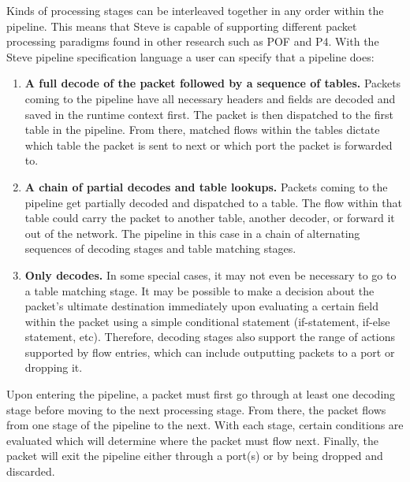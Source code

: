 Kinds of processing stages can be interleaved together in any order within the pipeline. This means that Steve is capable of supporting different packet processing paradigms found in other research such as POF and P4. With the Steve pipeline specification language a user can specify that a pipeline does:

\begin{enumerate}
\item \textbf{A full decode of the packet followed by a sequence of tables.} Packets coming to the pipeline have all necessary headers and fields are decoded and saved in the runtime context first. The packet is then dispatched to the first table in the pipeline. From there, matched flows within the tables dictate which table the packet is sent to next or which port the packet is forwarded to.
\item \textbf{A chain of partial decodes and table lookups.} Packets coming to the pipeline get partially decoded and dispatched to a table. The flow within that table could carry the packet to another table, another decoder, or forward it out of the network. The pipeline in this case in a chain of alternating sequences of decoding stages and table matching stages.
\item \textbf{Only decodes.} In some special cases, it may not even be necessary to go to a table matching stage. It may be possible to make a decision about the packet’s ultimate destination immediately upon evaluating a certain field within the packet using a simple conditional statement (if-statement, if-else statement, etc). Therefore, decoding stages also support the range of actions supported by flow entries, which can include outputting packets to a port or dropping it.
\end{enumerate}

Upon entering the pipeline, a packet must first go through at least one decoding stage before moving to the next processing stage. From there, the packet flows from one stage of the pipeline to the next. With each stage, certain conditions are evaluated which will determine where the packet must flow next. Finally, the packet will exit the pipeline either through a port(s) or by being dropped and discarded.

